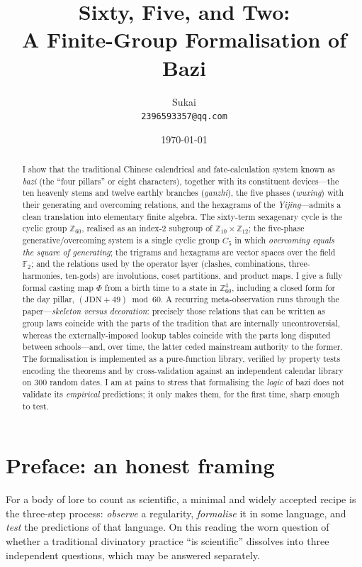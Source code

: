 \documentclass[11pt,a4paper]{article}
\title{\textbf{Sixty, Five, and Two:\\ A Finite-Group Formalisation of Bazi}}
\author{Sukai\\ \texttt{2396593357@qq.com}}
\date{\today}
\theoremstyle{definition}
\theoremstyle{remark}
\newcommand{\Z}{\mathbb{Z}}
\newcommand{\F}{\mathbb{F}}
\begin{document}
\maketitle

\begin{abstract}
I show that the traditional Chinese calendrical and fate-calculation system known as \emph{bazi} (the ``four pillars'' or eight characters), together with its constituent devices---the ten heavenly stems and twelve earthly branches (\emph{ganzhi}), the five phases (\emph{wuxing}) with their generating and overcoming relations, and the hexagrams of the \emph{Yijing}---admits a clean translation into elementary finite algebra. The sixty-term sexagenary cycle is the cyclic group $\Z_{60}$, realised as an index-$2$ subgroup of $\Z_{10}\times\Z_{12}$; the five-phase generative/overcoming system is a single cyclic group $C_5$ in which \emph{overcoming equals the square of generating}; the trigrams and hexagrams are vector spaces over the field $\F_2$; and the relations used by the operator layer (clashes, combinations, three-harmonies, ten-gods) are involutions, coset partitions, and product maps. I give a fully formal casting map $\Phi$ from a birth time to a state in $\Z_{60}^4$, including a closed form for the day pillar, $(\mathrm{JDN}+49)\bmod 60$. A recurring meta-observation runs through the paper---\emph{skeleton versus decoration}: precisely those relations that can be written as group laws coincide with the parts of the tradition that are internally uncontroversial, whereas the externally-imposed lookup tables coincide with the parts long disputed between schools---and, over time, the latter ceded mainstream authority to the former. The formalisation is implemented as a pure-function library, verified by property tests encoding the theorems and by cross-validation against an independent calendar library on $300$ random dates. I am at pains to stress that formalising the \emph{logic} of bazi does not validate its \emph{empirical} predictions; it only makes them, for the first time, sharp enough to test.
\end{abstract}

\newpage
\section*{Preface: an honest framing}
For a body of lore to count as scientific, a minimal and widely accepted recipe is the three-step process: \emph{observe} a regularity, \emph{formalise} it in some language, and \emph{test} the predictions of that language. On this reading the worn question of whether a traditional divinatory practice ``is scientific'' dissolves into three independent questions, which may be answered separately.
\end{document}
